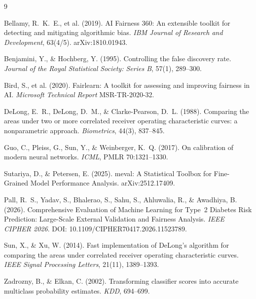 \documentclass[11pt]{article}
\begin{document}
\begin{thebibliography}{9}

 Bellamy, R.~K.~E., et al. (2019). AI Fairness 360: An extensible toolkit for
detecting and mitigating algorithmic bias. \emph{IBM Journal of Research and Development},
63(4/5). arXiv:1810.01943.

 Benjamini, Y., \& Hochberg, Y. (1995). Controlling the false discovery rate.
\emph{Journal of the Royal Statistical Society: Series B}, 57(1), 289--300.

 Bird, S., et al. (2020). Fairlearn: A toolkit for assessing and improving
fairness in AI. \emph{Microsoft Technical Report} MSR-TR-2020-32.

 DeLong, E.~R., DeLong, D.~M., \& Clarke-Pearson, D.~L. (1988). Comparing the
areas under two or more correlated receiver operating characteristic curves: a nonparametric
approach. \emph{Biometrics}, 44(3), 837--845.

 Guo, C., Pleiss, G., Sun, Y., \& Weinberger, K.~Q. (2017). On calibration of
modern neural networks. \emph{ICML}, PMLR 70:1321--1330.

 Sutariya, D., \& Petersen, E. (2025). meval: A Statistical Toolbox for
Fine-Grained Model Performance Analysis. arXiv:2512.17409.

 Pall, R.~S., Yadav, S., Bhalerao, S., Sahu, S., Ahluwalia, R., \&
Awadhiya, B. (2026). Comprehensive Evaluation of Machine Learning for Type~2 Diabetes Risk
Prediction: Large-Scale External Validation and Fairness Analysis. \emph{IEEE CIPHER 2026}.
DOI: 10.1109/CIPHER70417.2026.11523789.

 Sun, X., \& Xu, W. (2014). Fast implementation of DeLong's algorithm for
comparing the areas under correlated receiver operating characteristic curves. \emph{IEEE
Signal Processing Letters}, 21(11), 1389--1393.

 Zadrozny, B., \& Elkan, C. (2002). Transforming classifier scores into
accurate multiclass probability estimates. \emph{KDD}, 694--699.

\end{thebibliography}
\end{document}
